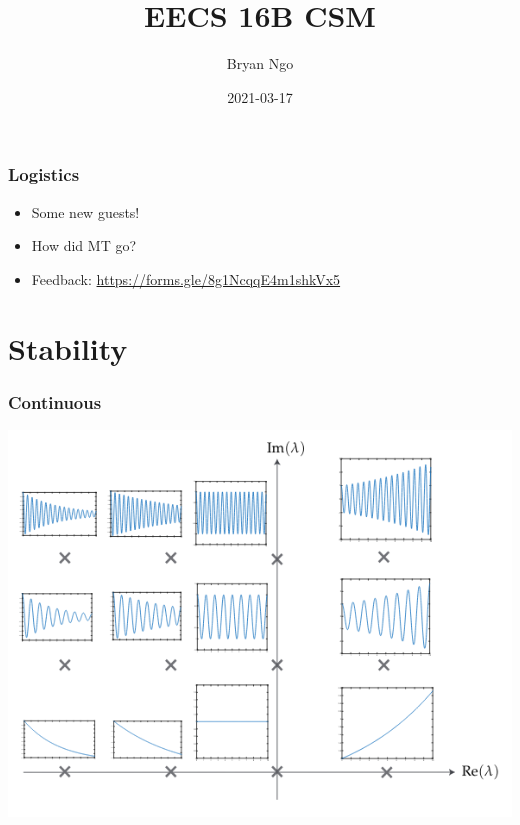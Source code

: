 \documentclass[aspectratio=169]{beamer}
\title{EECS 16B CSM}
\author{Bryan Ngo}
\date{2021-03-17}
\institute{UC Berkeley}
\begin{document}
\begin{frame}
    \maketitle
\end{frame}

\begin{frame}
    \frametitle{Logistics}

    \begin{itemize}
        \item Some new guests!
        \item How did MT go?
        \item Feedback: \url{https://forms.gle/8g1NcqqE4m1shkVx5}
    \end{itemize}
\end{frame}

\section{Stability}

\begin{frame}
    \frametitle{Continuous}
    
    \centering
    \includegraphics[width=\textheight]{continuous.png}
\end{frame}
\end{document}

